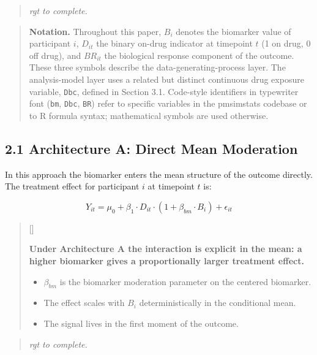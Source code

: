 \documentclass[
  11pt,
]{article}
\newcounter{pgraph}
\newenvironment{bullets}{%
  \stepcounter{pgraph}%
  \begin{quote}\small\sffamily\color[gray]{0.30}%
  {\normalfont\scriptsize\color[gray]{0.58}[\thepgraph]\enspace}}{%
  \end{quote}}
\newenvironment{rgt}{%
  \begin{quote}\small\itshape\color[RGB]{20,60,160}}{%
  \end{quote}}
\newenvironment{orig}{%
  \begin{quote}\normalsize\color[gray]{0.55}}{%
  \end{quote}}
\begin{document}
\begin{rgt}
rgt to complete.

\end{rgt}

\begin{orig}
\textbf{Notation.} Throughout this paper, \(B_i\) denotes the biomarker
value of participant \(i\), \(D_{it}\) the binary on-drug indicator at
timepoint \(t\) (1 on drug, 0 off drug), and \(BR_{it}\) the biological
response component of the outcome. These three symbols describe the
data-generating-process layer. The analysis-model layer uses a related
but distinct continuous drug exposure variable, \texttt{Dbc}, defined in
Section 3.1. Code-style identifiers in typewriter font (\texttt{bm},
\texttt{Dbc}, \texttt{BR}) refer to specific variables in the pmsimstats
codebase or to R formula syntax; mathematical symbols are used
otherwise.

\end{orig}

\subsection{2.1 Architecture A: Direct Mean Moderation}

In this approach the biomarker enters the mean structure of the outcome
directly. The treatment effect for participant \(i\) at timepoint \(t\)
is:

\[Y_{it} = \mu_0 + \beta_1 \cdot D_{it} \cdot (1 + \beta_{bm}
\cdot B_i) + \epsilon_{it}\]

\begin{bullets}

\textbf{Under Architecture A the interaction is explicit in the
mean: a higher biomarker gives a proportionally larger treatment
effect.}

\begin{itemize}\setlength{\itemsep}{2pt}\setlength{\parskip}{0pt}
\item $\beta_{bm}$ is the biomarker moderation parameter on the
centered biomarker.
\item The effect scales with $B_i$ deterministically in the
conditional mean.
\item The signal lives in the first moment of the outcome.
\end{itemize}

\end{bullets}

\begin{rgt}
rgt to complete.

\end{rgt}
\end{document}
